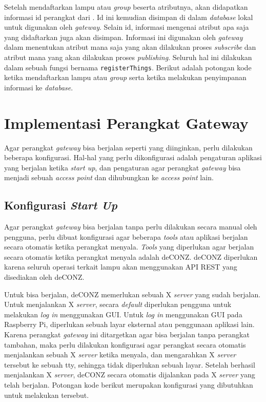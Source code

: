 

Setelah mendaftarkan lampu atau \textit{group} beserta atributnya, akan didapatkan informasi id perangkat dari \plat. Id ini kemudian disimpan di dalam \textit{database} lokal untuk digunakan oleh \textit{gateway}. Selain id, informasi mengenai atribut apa saja yang didaftarkan juga akan disimpan. Informasi ini digunakan oleh \textit{gateway} dalam menentukan atribut mana saja yang akan dilakukan proses \textit{subscribe} dan atribut mana yang akan dilakukan proses \textit{publishing}. Seluruh hal ini dilakukan dalam sebuah fungsi bernama \texttt{registerThings}. Berikut adalah potongan kode ketika mendaftarkan lampu atau \textit{group} serta ketika melakukan penyimpanan informasi ke \textit{database}.



\section{Implementasi Perangkat Gateway}
Agar perangkat \textit{gateway} bisa berjalan seperti yang diinginkan, perlu dilakukan beberapa konfigurasi. Hal-hal yang perlu dikonfigurasi adalah pengaturan aplikasi yang berjalan ketika \textit{start up}, dan pengaturan agar perangkat \textit{gateway} bisa menjadi sebuah \textit{access point} dan dihubungkan ke \textit{access point} lain.

\subsection{Konfigurasi \textit{Start Up}}
Agar perangkat \textit{gateway} bisa berjalan tanpa perlu dilakukan secara manual oleh pengguna, perlu dibuat konfigurasi agar beberapa \textit{tools} atau aplikasi berjalan secara otomatis ketika perangkat menyala. \textit{Tools} yang diperlukan agar berjalan secara otomatis ketika perangkat menyala adalah deCONZ. deCONZ diperlukan karena seluruh operasi terkait lampu akan menggunakan API REST yang disediakan oleh deCONZ.

Untuk bisa berjalan, deCONZ memerlukan sebuah X \textit{server} yang sudah berjalan. Untuk menjalankan X \textit{server}, secara \textit{default} diperlukan pengguna untuk melakukan \textit{log in} menggunakan GUI. Untuk \textit{log in} menggunakan GUI pada Raspberry Pi, diperlukan sebuah layar eksternal atau penggunaan aplikasi lain. Karena perangkat \textit{gateway} ini ditargetkan agar bisa berjalan tanpa perangkat tambahan, maka perlu dilakukan konfigurasi agar perangkat secara otomatis menjalankan sebuah X \textit{server} ketika menyala, dan mengarahkan X \textit{server} tersebut ke sebuah tty, sehingga tidak diperlukan sebuah layar. Setelah berhasil menjalankan X \textit{server}, deCONZ secara otomatis dijalankan pada X \textit{server} yang telah berjalan. Potongan kode berikut merupakan konfigurasi yang dibutuhkan untuk melakukan tersebut.

